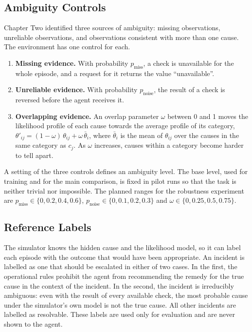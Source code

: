 \documentclass[12pt,a4paper]{article}
\begin{document}
\subsection{Ambiguity Controls}
\label{sec:ambiguity}

Chapter Two identified three sources of ambiguity: missing observations, unreliable observations, and observations consistent with more than one cause. The environment has one control for each.

\begin{enumerate}
  \item \textbf{Missing evidence.} With probability $p_{\text{miss}}$, a check is unavailable for the whole episode, and a request for it returns the value ``unavailable''.
  \item \textbf{Unreliable evidence.} With probability $p_{\text{noise}}$, the result of a check is reversed before the agent receives it.
  \item \textbf{Overlapping evidence.} An overlap parameter $\omega$ between 0 and 1 moves the likelihood profile of each cause towards the average profile of its category, $\theta'_{ij} = (1 - \omega)\,\theta_{ij} + \omega\,\bar{\theta}_{i}$, where $\bar{\theta}_{i}$ is the mean of $\theta_{ij}$ over the causes in the same category as $c_j$. As $\omega$ increases, causes within a category become harder to tell apart.
\end{enumerate}

A setting of the three controls defines an ambiguity level. The base level, used for training and for the main comparison, is fixed in pilot runs so that the task is neither trivial nor impossible. The planned ranges for the robustness experiment are $p_{\text{miss}} \in \{0, 0.2, 0.4, 0.6\}$, $p_{\text{noise}} \in \{0, 0.1, 0.2, 0.3\}$ and $\omega \in \{0, 0.25, 0.5, 0.75\}$.

\subsection{Reference Labels}
\label{sec:labels}

The simulator knows the hidden cause and the likelihood model, so it can label each episode with the outcome that would have been appropriate. An incident is labelled as one that should be escalated in either of two cases. In the first, the operational rules prohibit the agent from recommending the remedy for the true cause in the context of the incident. In the second, the incident is irreducibly ambiguous: even with the result of every available check, the most probable cause under the simulator's own model is not the true cause. All other incidents are labelled as resolvable. These labels are used only for evaluation and are never shown to the agent.
\end{document}
